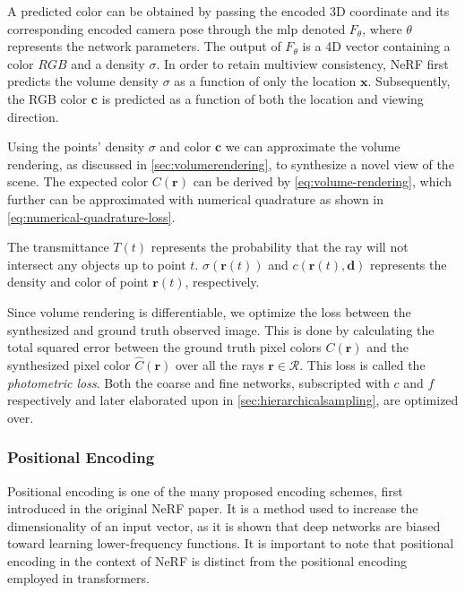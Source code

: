 

A predicted color can be obtained by passing the encoded 3D coordinate and its corresponding encoded camera pose through the \acrshort{mlp} denoted $F_{\theta}$, where $\theta$ represents the network parameters. The output of $F_\theta$ is a 4D vector containing a color $RGB$ and a density $\sigma$. In order to retain multiview consistency, NeRF first predicts the volume density $\sigma$ as a function of only the location $\textbf{x}$. Subsequently, the RGB color $\pmb{c}$ is predicted as a function of both the location and viewing direction.


Using the points' density $\sigma$ and color $\pmb{c}$ we can approximate the volume rendering, as discussed in \autoref{sec:volumerendering}, to synthesize a novel view of the scene. The expected color $C(\pmb{r})$ can be derived by \autoref{eq:volume-rendering}, which further can be approximated with numerical quadrature as shown in \autoref{eq:numerical-quadrature-loss}.





The transmittance $T(t)$ represents the probability that the ray will not intersect any objects up to point $t$. $\sigma(\pmb{r}(t))$ and $c(\pmb{r}(t), \pmb{d})$ represents the density and color of point $\pmb{r}(t)$, respectively.

Since volume rendering is differentiable, we optimize the loss between the synthesized and ground truth observed image. This is done by calculating the total squared error between the ground truth pixel colors $C(\pmb{r})$ and the synthesized pixel color $\hat{C}(\pmb{r})$ over all the rays $\pmb{r} \in \mathcal{R}$. This loss is called the \textit{photometric loss}. Both the coarse and fine networks, subscripted with $c$ and $f$ respectively and later elaborated upon in \autoref{sec:hierarchicalsampling}, are optimized over.



\subsubsection{Positional Encoding} \label{sec:positionalencoding}
Positional encoding is one of the many proposed encoding schemes, first introduced in the original NeRF paper. It is a method used to increase the dimensionality of an input vector, as it is shown that deep networks are biased toward learning lower-frequency functions. It is important to note that positional encoding in the context of NeRF is distinct from the positional encoding employed in transformers.

